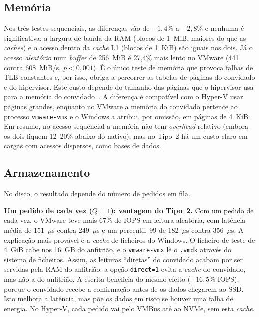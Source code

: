 \documentclass[conference]{IEEEtran}
\begin{document}
\subsection{Memória}\label{sec_mem}
Nos três testes sequenciais, as diferenças vão de $-1{,}4\%$ a $+2{,}8\%$ e nenhuma é significativa: a largura de banda da RAM (blocos de 1~MiB, maiores do que as \textit{caches}) e o acesso dentro da \textit{cache} L1 (blocos de 1~KiB) são iguais nos dois. Já o acesso \textit{aleatório} num \textit{buffer} de 256~MiB é 27,4\% mais lento no VMware (441 contra 608~MiB/s, $p<0{,}001$). É o único teste de memória que provoca falhas de TLB constantes e, por isso, obriga a percorrer as tabelas de páginas do convidado e do hipervisor. Este custo depende do tamanho das páginas que o hipervisor usa para a memória do convidado~\cite{b10}. A diferença é compatível com o Hyper-V usar páginas grandes, enquanto no VMware a memória do convidado pertence ao processo \texttt{vmware-vmx} e o Windows a atribui, por omissão, em páginas de 4~KiB. Em resumo, no acesso sequencial a memória não tem \textit{overhead} relativo (embora os dois fiquem 12--20\% abaixo do nativo), mas no Tipo~2 há um custo claro em cargas com acessos dispersos, como bases de dados.

\subsection{Armazenamento}
No disco, o resultado depende do número de pedidos em fila.

\textbf{Um pedido de cada vez ($Q=1$): vantagem do Tipo~2.} Com um pedido de cada vez, o VMware teve mais 67\% de IOPS em leitura aleatória, com latência média de 151~$\mu$s contra 249~$\mu$s e um percentil~99 de 182~$\mu$s contra 356~$\mu$s. A explicação mais provável é a \textit{cache} de ficheiros do Windows. O ficheiro de teste de 4~GiB cabe nos 16~GB do anfitrião, e o \texttt{vmware-vmx} lê o \texttt{.vmdk} através do sistema de ficheiros. Assim, as leituras ``diretas'' do convidado acabam por ser servidas pela RAM do anfitrião: a opção \texttt{direct=1} evita a \textit{cache} do convidado, mas não a do anfitrião. A escrita beneficia do mesmo efeito ($+16{,}5\%$ IOPS), porque o convidado recebe a confirmação antes de os dados chegarem ao SSD. Isto melhora a latência, mas põe os dados em risco se houver uma falha de energia. No Hyper-V, cada pedido vai pelo VMBus até ao NVMe, sem esta \textit{cache}.
\end{document}
